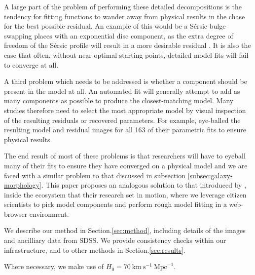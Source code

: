 \documentclass[../main.tex]{subfiles}
\begin{document}
A large part of the problem of performing these detailed decompositions is the tendency for fitting functions to wander away from physical results in the chase for the best possible residual. An example of this would be a S\'ersic bulge swapping places with an exponential disc component, as the extra degree of freedom of the S\'ersic profile will result in a more desirable residual \citep{Kruk2017:1705.00007v1}. It is also the case that often, without near-optimal starting points, detailed model fits will fail to converge at all.

A third problem which needs to be addressed is whether a component should be present in the model at all. An automated fit will generally attempt to add as many components as possible to produce the closest-matching model. Many studies therefore need to select the most appropriate model by visual inspection of the resulting residuals or recovered parameters. For example, \citet{Vika2014:1408.4070v1} eye-balled the resulting model and residual images for all 163 of their parametric fits to ensure physical results.

The end result of most of these problems is that researchers will have to eyeball many of their fits to ensure they have converged on a physical model and we are faced with a similar problem to that discussed in subsection \ref{subsec:galaxy-morphology}. This paper proposes an analogous solution to that introduced by \cite{Lintott2008:0804.4483v1}, inside the ecosystem that their research set in motion, where we leverage citizen scientists to pick model components and perform rough model fitting in a web-browser environment.

We describe our method in Section.\ref{sec:method}, including details of the images and ancilliary data from SDSS. We provide consistency checks within our infrastructure, and to other methods in Section.\ref{sec:results}.

Where necessary, we make use of $H_0 = 70\ \text{km}\ \text{s}^{-1}\ \text{Mpc}^{-1}$.
\end{document}
